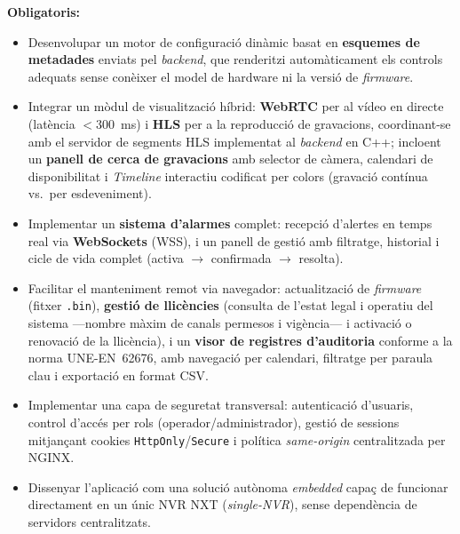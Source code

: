 \noindent\textbf{Obligatoris:}
\begin{itemize}
  \item Desenvolupar un motor de configuració dinàmic basat en \textbf{esquemes de metadades} enviats pel \textit{backend}, que renderitzi automàticament els controls adequats sense conèixer el model de hardware ni la versió de \textit{firmware}.
  \item Integrar un mòdul de visualització híbrid: \textbf{WebRTC} per al vídeo en directe (latència $<$300~ms) i \textbf{HLS} per a la reproducció de gravacions, coordinant-se amb el servidor de segments HLS implementat al \textit{backend} en C++; incloent un \textbf{panell de cerca de gravacions} amb selector de càmera, calendari de disponibilitat i \textit{Timeline} interactiu codificat per colors (gravació contínua vs.\ per esdeveniment).
  \item Implementar un \textbf{sistema d'alarmes} complet: recepció d'alertes en temps real via \textbf{WebSockets} (WSS), i un panell de gestió amb filtratge, historial i cicle de vida complet (activa $\to$ confirmada $\to$ resolta).
  \item Facilitar el manteniment remot via navegador: actualització de \textit{firmware} (fitxer \texttt{.bin}), \textbf{gestió de llicències} (consulta de l'estat legal i operatiu del sistema —nombre màxim de canals permesos i vigència— i activació o renovació de la llicència), i un \textbf{visor de registres d'auditoria} conforme a la norma UNE-EN~62676, amb navegació per calendari, filtratge per paraula clau i exportació en format CSV.
  \item Implementar una capa de seguretat transversal: autenticació d'usuaris, control d'accés per rols (operador/administrador), gestió de sessions mitjançant cookies \texttt{HttpOnly}/\texttt{Secure} i política \textit{same-origin} centralitzada per NGINX.
  \item Dissenyar l'aplicació com una solució autònoma \textit{embedded} capaç de funcionar directament en un únic NVR NXT (\textit{single-NVR}), sense dependència de servidors centralitzats.
\end{itemize}

